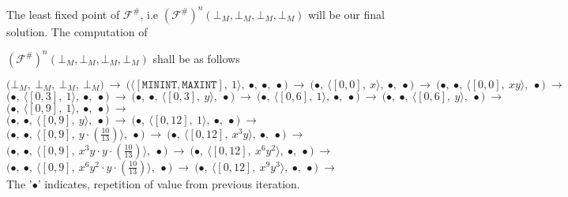 \documentclass[final,3p, review, times]{util/elsarticle}
\begin{document}
The least fixed point of $\mathcal{F^\#}$, i.e $(\mathcal{F^\#})^n(\bot_M, \bot_M, \bot_M, \bot_M)$ will be our final solution. The computation of

\noindent$(\mathcal{F^\#})^n(\bot_M, \bot_M, \bot_M, \bot_M)$ shall be as follows

\noindent
$
\bigg(\bot_M,\ \bot_M,\ \bot_M,\ \bot_M\bigg)\ \to\ 
\bigg(\big\langle[\mathtt{MININT},\mathtt{MAXINT}],\ 1\big\rangle,\ \bullet,\ \bullet,\ \bullet\bigg)\ \to\ 
\bigg(\bullet,\ \big\langle[0,0],\ x\big\rangle,\ \bullet,\ \bullet\bigg)\ \to\ 
\bigg(\bullet,\ \bullet,\ \big\langle[0,0],\ xy\big\rangle,\ \bullet\bigg)\ \to
$\\
$
\bigg(\bullet,\ \big\langle[0,3],\ 1\big\rangle,\ \bullet,\ \bullet\bigg)\ \to\ 
\bigg(\bullet,\ \bullet,\ \big\langle[0,3],\ y\big\rangle,\ \bullet\bigg)\ \to\ 
\bigg(\bullet,\ \big\langle[0,6],\ 1\big\rangle,\ \bullet,\ \bullet\bigg)\ \to\ 
\bigg(\bullet,\ \bullet,\ \big\langle[0,6],\ y\big\rangle,\ \bullet\bigg)\ \to
$\\
$
\bigg(\bullet,\ \big\langle[0,9],\ 1\big\rangle,\ \bullet,\ \bullet\bigg)\ \to
$\\
$\bigg(\bullet,\ \bullet,\ \big\langle[0,9],\ y\big\rangle,\ \bullet\bigg)\ \to\ 
\bigg(\bullet,\ \big\langle[0,12],\ 1\big\rangle,\ \bullet,\ \bullet\bigg)\ \to
$\\
$
\bigg(\bullet,\ \bullet,\ \big\langle[0,9],\ y\cdot\left(\frac{10}{13}\right)\big\rangle,\ \bullet\bigg)\ \to\ 
\bigg(\bullet,\ \big\langle[0,12],\ x^3y\big\rangle,\ \bullet,\ \bullet\bigg)\ \to
$\\
$
\bigg(\bullet,\ \bullet,\ \big\langle[0,9],\ x^3y\cdot y\cdot\left(\frac{10}{13}\right)\big\rangle,\ \bullet\bigg)\ \to\ 
\bigg(\bullet,\ \big\langle[0,12],\ x^6y^2\big\rangle,\ \bullet,\ \bullet\bigg)\ \to
$\\
$
\bigg(\bullet,\ \bullet,\ \big\langle[0,9],\ x^6y^2\cdot y\cdot\left(\frac{10}{13}\right)\big\rangle,\ \bullet\bigg)\ \to\ 
\bigg(\bullet,\ \big\langle[0,12],\ x^9y^3\big\rangle,\ \bullet,\ \bullet\bigg)\ \to
$\\
    
The '$\bullet$' indicates, repetition of value from previous iteration.

 









\end{document}
